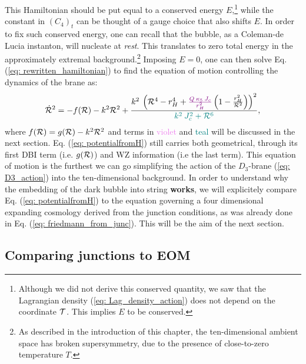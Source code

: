 This Hamiltonian should be put equal to a conserved energy $E$,\footnote{Although we did not derive this conserved quantity, we saw that the Lagrangian density (\ref{eq: Lag_density_action}) does not depend on the coordinate $\mathcal{T}$. This implies $E$ to be conserved.} while the constant in $(C_4)_t$ can be thought of a gauge choice that also shifts $E$. In order to fix such conserved energy, one can recall that the bubble, as a Coleman-de Lucia instanton, will nucleate at \textit{rest}. This translates to zero total energy in the approximately extremal background.\footnote{As described in the introduction of this chapter, the ten-dimensional ambient space has broken supersymmetry, due to the presence of close-to-zero temperature $T$.} Imposing $E=0$, one can then solve Eq. (\ref{eq: rewritten_hamiltonian}) to find the equation of motion controlling the dynamics of the brane as:
\begin{equation}\label{eq: potentialfromH}
    \dot{\mathcal{R}}^{2} = -f(\mathcal{R}) -k^2 \mathcal{R}^2 +  \frac{k^{2}\:\left(\mathcal{R}^{4}-r^{4}_{H}+\textcolor{violet}{\frac{Q \: \kappa_{5}\:J_{c}}{r_{H}^{2}}}\left(1-\frac{r_{H}^2}{\mathcal{R}^2}\right)\right)^2}{\textcolor{teal}{k^{2}\:J_{c}^{2}+\mathcal{R}^{6}}},
 \end{equation}
 where $f(\mathcal{R}) = g(\mathcal{R}) - k^{2} \mathcal{R}^{2}$ and terms in \textcolor{violet}{violet} and \textcolor{teal}{teal} will be discussed in the next section. Eq. (\ref{eq: potentialfromH}) still carries both geometrical, through its first DBI term (i.e. $g(\mathcal{R})$) and WZ information (i.e the last term). This equation of motion is the furthest we can go simplifying the action of the $D_{3}$-brane (\ref{eq: D3_action}) into the ten-dimensional background. In order to understand why the embedding of the dark bubble into string \textbf{works}, we will explicitely compare Eq. (\ref{eq: potentialfromH}) to the equation governing a four dimensional expanding cosmology derived from the junction conditions, as was already done in Eq. (\ref{eq: friedmann_from_junc}).  This will be the aim of the next section.

\subsection{Comparing junctions to EOM}

